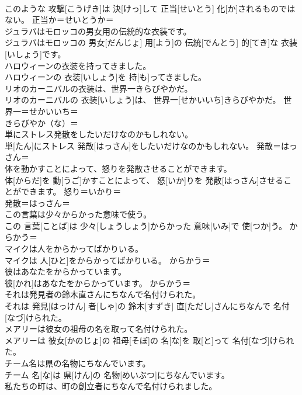 \documentclass[8pt]{extreport}
\begin{document}
\begin{CJK}{UTF8}{min}
\\	このような 攻撃[こうげき]は 決[けっ]して 正当[せいとう] 化[か]されるものではない。	正当か＝せいとうか＝ 
\\	ジュラバはモロッコの男女用の伝統的な衣装です。	
\\	ジュラバはモロッコの 男女[だんじょ] 用[よう]の 伝統[でんとう] 的[てき]な 衣装[いしょう]です。	
\\	ハロウィーンの衣装を持ってきました。	
\\	ハロウィーンの 衣装[いしょう]を 持[も]ってきました。	
\\	リオのカーニバルの衣装は、世界一きらびやかだ。	
\\	リオのカーニバルの 衣装[いしょう]は、 世界一[せかいいち]きらびやかだ。	世界一＝せかいいち＝ 
\\	きらびやか（な）＝ 
\\	単にストレス発散をしたいだけなのかもしれない。	
\\	単[たん]にストレス 発散[はっさん]をしたいだけなのかもしれない。	発散＝はっさん＝ 
\\	体を動かすことによって、怒りを発散させることができます。	
\\	体[からだ]を 動[うご]かすことによって、 怒[いか]りを 発散[はっさん]させることができます。	怒り＝いかり＝ 
\\	発散＝はっさん＝ 
\\	この言葉は少々からかった意味で使う。	
\\	この 言葉[ことば]は 少々[しょうしょう]からかった 意味[いみ]で 使[つか]う。	からかう＝ 
\\	マイクは人をからかってばかりいる。	
\\	マイクは 人[ひと]をからかってばかりいる。	からかう＝ 
\\	彼はあなたをからかっています。	
\\	彼[かれ]はあなたをからかっています。	からかう＝ 
\\	それは発見者の鈴木直さんにちなんで名付けられた。	
\\	それは 発見[はっけん] 者[しゃ]の 鈴木[すずき] 直[ただし]さんにちなんで 名付[なづ]けられた。	
\\	メアリーは彼女の祖母の名を取って名付けられた。	
\\	メアリーは 彼女[かのじょ]の 祖母[そぼ]の 名[な]を 取[と]って 名付[なづ]けられた。	
\\	チーム名は県の名物にちなんでいます。	
\\	チーム 名[な]は 県[けん]の 名物[めいぶつ]にちなんでいます。	
\\	私たちの町は、町の創立者にちなんで名付けられました。	

\end{CJK}
\end{document}
